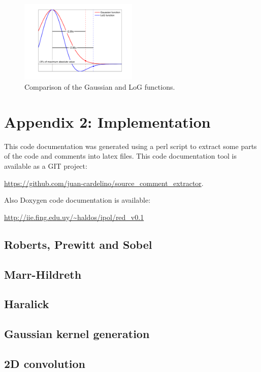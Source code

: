 \documentclass{ipol}
\numberwithin{equation}{section}
\numberwithin{table}{section}
\numberwithin{figure}{section}
\begin{document}
\begin{figure}
	\centering
	\includegraphics[width=0.5\textwidth]{kernels.pdf}
	\caption{Comparison of the Gaussian and LoG functions.}
	\label{fig:kernels}
\end{figure}

\clearpage
\section{Appendix 2: Implementation}
\label{sec:appendix2}

This code documentation was generated using a perl script to extract some parts of the 
code and comments into latex files. This code documentation tool is available as a GIT
project: 
\begin{center} 
\url{https://github.com/juan-cardelino/source_comment_extractor}. \\
\end{center}
Also Doxygen code documentation is available:
\begin{center}
\url{http://iie.fing.edu.uy/~haldos/ipol/red_v0.1}
\end{center}

\subsection{Roberts, Prewitt and Sobel}


\subsection{Marr-Hildreth}
\label{app:marr-hildreth}


\subsection{Haralick}


\subsection{Gaussian kernel generation}


\subsection{2D convolution}


\end{document}
